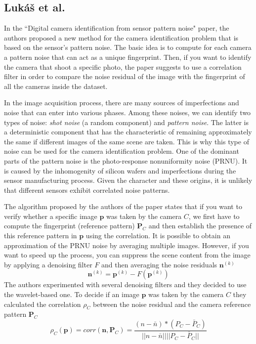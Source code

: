 \subsection{Lukáš et al.}
In the ``Digital camera identification from sensor pattern noise" paper, the authors proposed a new method for the camera identification problem that is based on the sensor's pattern noise. 
The basic idea is to compute for each camera a pattern noise that can act as a unique fingerprint. Then, if you want to identify the camera that shoot a specific photo, the paper suggests to use a correlation filter in order to compare the noise residual of the image with the fingerprint of all the cameras inside the dataset.

In the image acquisition process, there are many sources of imperfections and noise that can enter into various phases. Among these noises, we can identify two types of noise: \textit{shot noise} (a random component) and \textit{pattern noise}. The latter is a deterministic component that has the characteristic of remaining approximately the same if different images of the same scene are taken. This is why this type of noise can be used for the camera identification problem. One of the dominant parts of the pattern noise is the photo-response nonuniformity noise (PRNU). It is caused by the inhomogenity of silicon wafers and imperfections during the sensor manufacturing process. Given the character and these origins, it is unlikely that different sensors exhibit correlated noise patterns.

The algorithm proposed by the authors of the paper states that if you want to verify whether a specific image $\boldsymbol{p}$ was taken by the camera $C$, we first have to compute the fingerprint (reference pattern) $\boldsymbol{P}_C$ and then establish the presence of this reference pattern in $\boldsymbol{p}$ using the correlation. It is possible to obtain an approximation of the PRNU noise by averaging multiple images. However, if you want to speed up the process, you can suppress the scene content from the image by applying a denoising filter $F$ and then averaging the noise residuals $\boldsymbol{n}^{(k)}$
	\[ \boldsymbol{n}^{(k)} = \boldsymbol{p}^{(k)} -  F(\boldsymbol{p}^{(k)})\]
The authors experimented with several denoising filters and they decided to use the wavelet-based one. 
To decide if an image $\boldsymbol{p}$ was taken by the camera $C$ they calculated the correlation $\rho_C$ between the noise residual and the camera reference pattern $\boldsymbol{P}_C$
\[ \rho_C(\boldsymbol{p}) = corr(\boldsymbol{n}, \boldsymbol{P}_C) = \frac{(n-\bar{n})*(P_C - \bar{P}_C)}{||n-\bar{n}||||P_C-\bar{P}_C||}	\]
